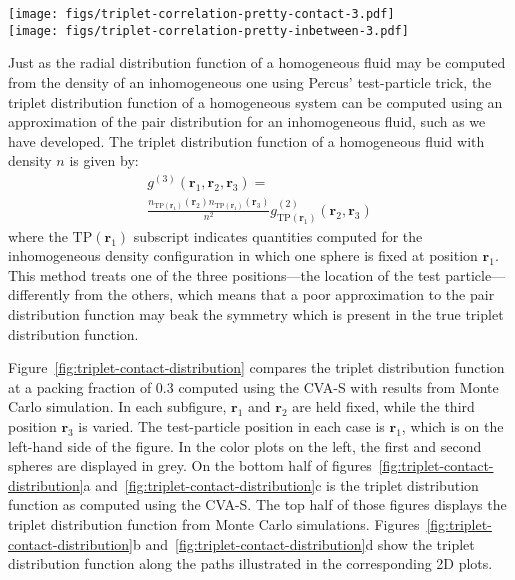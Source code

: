 \documentclass[letterpaper,twocolumn,amsmath,amssymb,pre,aps,10pt]{revtex4-1}
\newcommand{\rr}{\textbf{r}}
\begin{document}
\begin{figure*}
  \texttt{[image: figs/triplet-correlation-pretty-contact-3.pdf]}
\\
  \texttt{[image: figs/triplet-correlation-pretty-inbetween-3.pdf]}
  \caption{The triplet distribution function
    $g^{(3)}(\rr_1,\rr_2,\rr_3)$ at packing fraction 0.3, plotted when
    $\rr_1$ and $\rr_2$ are in contact (a,b) and when $\rr_1$ and
    $\rr_2$ are separated by a distance $2.1\sigma$ (c,d). On the left
    are 2D plots of $g^{(3)}(\rr_1,\rr_2,\rr_3)$ as $\rr_3$
    varies. \plotcomp{$g^{(3)}(\rr_1,\rr_2,\rr_3)$}. Note that an
    asymmetry is introduced in the theoretical results, so their
    values along a mirrored path are also shown, with arrows along the
    curve indicating the path
    direction.} \label{fig:triplet-contact-distribution}
\end{figure*}

Just as the radial distribution function of a homogeneous fluid may be
computed from the density of an inhomogeneous one using Percus'
test-particle trick, the triplet distribution function of a
homogeneous system can be computed using an approximation of the pair
distribution for an inhomogeneous fluid, such as we have
developed. The triplet distribution function of a homogeneous fluid
with density $n$ is given by:
\begin{multline}
    g^{(3)}(\rr_1,\rr_2,\rr_3) =\\
    \frac{n_{\textrm{TP}(\rr_1)}(\rr_2)
      n_{\textrm{TP}(\rr_1)}(\rr_3)}{n^2}
    g^{(2)}_{\textrm{TP}(\rr_1)}(\rr_2,\rr_3)
\end{multline}
where the $\textrm{TP}(\rr_1)$ subscript indicates quantities computed for
the inhomogeneous density configuration in which one sphere is fixed
at position $\rr_1$.  This method treats one of the three
positions---the location of the test particle---differently from the
others, which means that a poor approximation to the pair distribution
function may beak the symmetry which is present in the true triplet
distribution function.

Figure~\ref{fig:triplet-contact-distribution} compares the triplet
distribution function at a packing fraction of 0.3 computed using the
CVA-S with results from Monte Carlo simulation.  In each subfigure,
$\rr_1$ and $\rr_2$ are held fixed, while the third position $\rr_3$
is varied.  The test-particle position in each case is $\rr_1$, which
is on the left-hand side of the figure.  In the color plots on the
left, the first and second spheres are displayed in grey.  On the
bottom half of figures~\ref{fig:triplet-contact-distribution}a
and~\ref{fig:triplet-contact-distribution}c is the triplet
distribution function as computed using the CVA-S.  The top half of
those figures displays the triplet distribution function from Monte
Carlo simulations.  Figures~\ref{fig:triplet-contact-distribution}b
and~\ref{fig:triplet-contact-distribution}d show the triplet
distribution function along the paths illustrated in the corresponding
2D plots.
\end{document}
